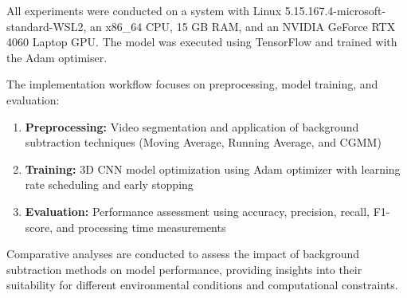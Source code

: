 All experiments were conducted on a system with Linux 5.15.167.4-microsoft-standard-WSL2, an x86\_64 CPU, 15 GB RAM, and an NVIDIA GeForce RTX 4060 Laptop GPU. The model was executed using TensorFlow and trained with the Adam optimiser.

The implementation workflow focuses on preprocessing, model training, and evaluation:

\begin{enumerate}
\item \textbf{Preprocessing:} Video segmentation and application of background subtraction techniques (Moving Average, Running Average, and CGMM)
\item \textbf{Training:} 3D CNN model optimization using Adam optimizer with learning rate scheduling and early stopping
\item \textbf{Evaluation:} Performance assessment using accuracy, precision, recall, F1-score, and processing time measurements
\end{enumerate}

Comparative analyses are conducted to assess the impact of background subtraction methods on model performance, providing insights into their suitability for different environmental conditions and computational constraints.